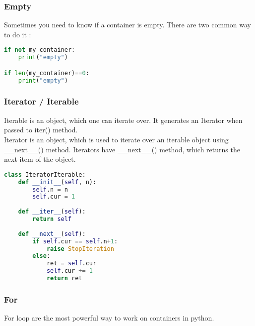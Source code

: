 \documentclass[a4paper, 12pt, titlepage]{scrartcl} %
\begin{document}
\subsubsection{Empty}
Sometimes you need to know if a container is empty. There are two common way to do it :
\begin{lstlisting}[language=Python]
if not my_container:
    print("empty")

if len(my_container)==0:
    print("empty")
\end{lstlisting}

\subsubsection{Iterator / Iterable}
Iterable is an object, which one can iterate over. It generates an Iterator when passed to iter() method. \\
Iterator is an object, which is used to iterate over an iterable object using \_\_next\_\_() method. Iterators have \_\_next\_\_() method, which returns the next item of the object.
\begin{lstlisting}[language=Python]
class IteratorIterable:
    def __init__(self, n):
        self.n = n
        self.cur = 1
        
    def __iter__(self):
        return self
        
    def __next__(self):
        if self.cur == self.n+1:
            raise StopIteration
        else:
            ret = self.cur
            self.cur += 1 
            return ret
\end{lstlisting}

\subsubsection{For}
\label{subsec:For}
For loop are the most powerful way to work on containers in python.
\end{document}

